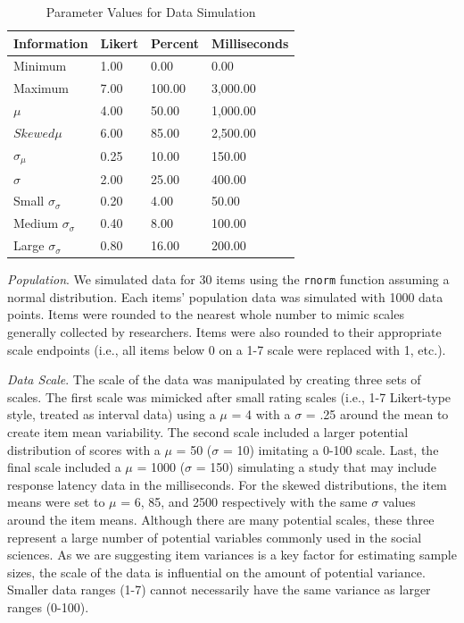 \documentclass[
  man]{apa7}
\begin{document}
\begin{table}[tbp]

\begin{center}
\begin{threeparttable}

\caption{\label{tab:table-sim}Parameter Values for Data Simulation}

\begin{tabular}{llll}
\toprule
Information & \multicolumn{1}{c}{Likert} & \multicolumn{1}{c}{Percent} & \multicolumn{1}{c}{Milliseconds}\\
\midrule
Minimum & 1.00 & 0.00 & 0.00\\
Maximum & 7.00 & 100.00 & 3,000.00\\
$\mu$ & 4.00 & 50.00 & 1,000.00\\
$Skewed \mu$ & 6.00 & 85.00 & 2,500.00\\
$\sigma_{\mu}$ & 0.25 & 10.00 & 150.00\\
$\sigma$ & 2.00 & 25.00 & 400.00\\
Small $\sigma_{\sigma}$ & 0.20 & 4.00 & 50.00\\
Medium $\sigma_{\sigma}$ & 0.40 & 8.00 & 100.00\\
Large $\sigma_{\sigma}$ & 0.80 & 16.00 & 200.00\\
\bottomrule
\end{tabular}

\end{threeparttable}
\end{center}

\end{table}

\emph{Population}. We simulated data for 30 items using the \texttt{rnorm} function assuming a normal distribution. Each items' population data was simulated with 1000 data points. Items were rounded to the nearest whole number to mimic scales generally collected by researchers. Items were also rounded to their appropriate scale endpoints (i.e., all items below 0 on a 1-7 scale were replaced with 1, etc.).

\emph{Data Scale}. The scale of the data was manipulated by creating three sets of scales. The first scale was mimicked after small rating scales (i.e., 1-7 Likert-type style, treated as interval data) using a \(\mu\) = 4 with a \(\sigma\) = .25 around the mean to create item mean variability. The second scale included a larger potential distribution of scores with a \(\mu\) = 50 (\(\sigma\) = 10) imitating a 0-100 scale. Last, the final scale included a \(\mu\) = 1000 (\(\sigma\) = 150) simulating a study that may include response latency data in the milliseconds. For the skewed distributions, the item means were set to \(\mu\) = 6, 85, and 2500 respectively with the same \(\sigma\) values around the item means. Although there are many potential scales, these three represent a large number of potential variables commonly used in the social sciences. As we are suggesting item variances is a key factor for estimating sample sizes, the scale of the data is influential on the amount of potential variance. Smaller data ranges (1-7) cannot necessarily have the same variance as larger ranges (0-100).
\end{document}
